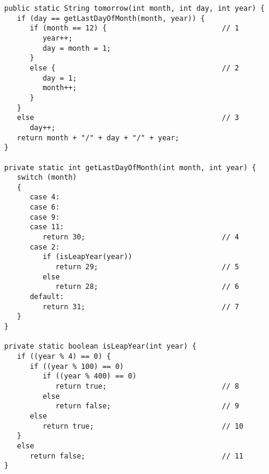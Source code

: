 \documentclass[12pt]{exam}
\begin{document}
\begin{Verbatim}[fontsize=\small]
public static String tomorrow(int month, int day, int year) {
   if (day == getLastDayOfMonth(month, year)) {   
      if (month == 12) {                           // 1
         year++;
         day = month = 1;
      }
      else {                                       // 2
         day = 1;
         month++;
      }
   }
   else                                            // 3
      day++;
   return month + "/" + day + "/" + year;
}
    
private static int getLastDayOfMonth(int month, int year) {
   switch (month)
   {
      case 4:
      case 6:
      case 9:
      case 11:
         return 30;                                // 4
      case 2:
         if (isLeapYear(year))                    
            return 29;                             // 5
         else                                      
            return 28;                             // 6       
      default:
         return 31;                                // 7
   }
}
   
private static boolean isLeapYear(int year) {
   if ((year % 4) == 0) {                          
      if ((year % 100) == 0)                       
         if ((year % 400) == 0)                    
            return true;                           // 8
         else                                      
            return false;                          // 9
      else                                         
         return true;                              // 10
   }
   else                                            
      return false;                                // 11
}
\end{Verbatim}

\clearpage
\end{document}
